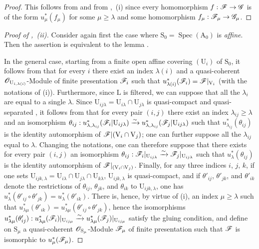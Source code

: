 \begin{proof}
This follows from  and from ,~(i) since every homomorphism $f:\mathscr{F}\to\mathscr{G}$ is of the form $u_\mu^*(f_\mu)$ for some $\mu\geqslant\lambda$ and some homomorphism $f_\mu:\mathscr{F}_\mu\to\mathscr{G}_\mu$.
\end{proof}

\begin{proof}[Proof of ,~(ii)]
Consider again first the case where $\mathrm{S}_0=\operatorname{Spec}(\mathrm{A}_0)$ is \emph{affine}.
Then the assertion is equivalent to the lemma .

In the general case, starting from a finite open affine covering $(\mathrm{U}_i)$ of $\mathrm{S}_0$, it follows from  that for every $i$ there exist an index $\lambda(i)$ and a quasi-coherent $\mathscr{O}_{\mathrm{U}_{i,\lambda(i)}}$-Module of finite presentation $\mathscr{F}_i$ such that $u_{\lambda(i)}^*(\mathscr{F}_i)=\mathscr{F}|_{\mathrm{V}_i}$ (with the notations of (i)).
Furthermore, since $\mathrm{L}$ is filtered, we can suppose that all the $\lambda_i$ are equal to a single $\lambda$.
Since $\mathrm{U}_{ij\lambda}=\mathrm{U}_{i\lambda}\cap\mathrm{U}_{j\lambda}$ is quasi-compact and quasi-separated , it follows from  that for every pair $(i,j)$ there exist an index $\lambda_{ij}\geqslant\lambda$ and an isomorphism $\theta_{ij}:u_{\lambda,\lambda_{ij}}^*(\mathscr{F}_i|\mathrm{U}_{ij\lambda})\xrightarrow{\sim}u_{\lambda,\lambda_{ij}}^*(\mathscr{F}_j|\mathrm{U}_{ij\lambda})$
such that $u_{\lambda_{ij}}^*(\theta_{ij})$ is the identity automorphism of $\mathscr{F}|(\mathrm{V}_i\cap\mathrm{V}_j)$; one can further suppose all the $\lambda_{ij}$ equal to $\lambda$.
Changing the notations, one can therefore suppose that there exists for every pair $(i,j)$ an isomorphism $\theta_{ij}:\mathscr{F}_i|_{\mathrm{U}_{ij\lambda}}\xrightarrow{\sim}\mathscr{F}_j|_{\mathrm{U}_{ij\lambda}}$ such that $u_\lambda^*(\theta_{ij})$ is the identity automorphism of $\mathscr{F}|_{(\mathrm{V}_i\cap\mathrm{V}_j)}$.
Finally, for any three indices $i$, $j$, $k$, if one sets $\mathrm{U}_{ijk,\lambda}=\mathrm{U}_{i\lambda}\cap\mathrm{U}_{j\lambda}\cap\mathrm{U}_{k\lambda}$, $\mathrm{U}_{ijk,\lambda}$ is quasi-compact, and if $\theta'_{ij}$, $\theta'_{jk}$, and $\theta'_{ik}$ denote the restrictions of $\theta_{ij}$, $\theta_{jk}$, and $\theta_{ik}$ to $\mathrm{U}_{ijk,\lambda}$, one has $u_\lambda^*(\theta'_{ij}\circ\theta'_{jk})=u_\lambda^*(\theta'_{ik})$.
There is, hence, by virtue of (i), an index $\mu\geqslant\lambda$ such that $u_{\lambda\mu}^*(\theta'_{ik})=u_{\lambda\mu}^*(\theta'_{ij}\circ\theta'_{jk})$, hence the isomorphisms $u_{\lambda\mu}^*(\theta'_{ij}):u_{\lambda\mu}^*(\mathscr{F}_i)|_{\mathrm{U}_{ij\mu}}\xrightarrow{\sim}u_{\lambda\mu}^*(\mathscr{F}_j)|_{\mathrm{U}_{ij\mu}}$ satisfy the gluing condition, and define on $\mathrm{S}_\mu$ a quasi-coherent $\mathscr{O}_{\mathrm{S}_\mu}$-Module $\mathscr{F}_\mu$ of finite presentation  such that $\mathscr{F}$ is isomorphic to $u_\mu^*(\mathscr{F}_\mu)$.
\end{proof}

